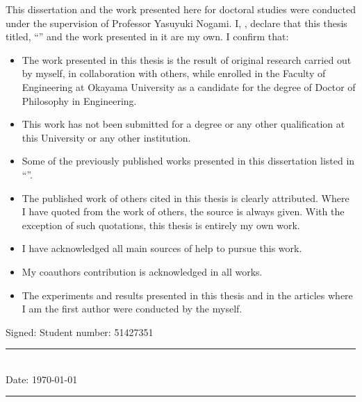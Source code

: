 \documentclass[
12pt, %
english, %
singlespacing, %
liststotoc, %
toctotoc, %
parskip, %
headsepline, %
consistentlayout, %
]{MastersDoctoralThesis} %
\begin{document}
\begin{declaration}
	
\addchaptertocentry{\authorshipname} %
\noindent This dissertation and the work presented here for doctoral studies were conducted under the supervision of Professor Yasuyuki Nogami. 
 I, \authorname, declare that this thesis titled, \enquote{\ttitle} and the work presented in it are my own. I confirm that:

\begin{itemize} 
\item 
The work presented in this thesis is the result of original research carried out by myself, in collaboration with others, while enrolled in the Faculty of Engineering at Okayama University as a candidate for the degree of Doctor of Philosophy in Engineering.

\item This work has not been submitted for a degree or any other qualification at this University or any other institution. 
 
\item  Some of the previously published works presented in this dissertation listed in ``''.

\item The published work of others cited in this thesis is clearly attributed.  Where I have quoted from the work of others, the source is always given. With the exception of such quotations, this thesis is entirely my own work.
\item I have acknowledged all main sources of help to pursue this work.
 \item My coauthors contribution is acknowledged  in all works. 
 \item The experiments and results presented in this thesis and in the articles where I am the first author were conducted by the myself.\\
\end{itemize}
 \vspace{8mm}
\noindent Signed: \quad \quad \quad \quad \authorname \quad \quad \quad \quad Student number: 51427351\\ 
\rule[0.5em]{36em}{0.5pt} \\
\noindent Date: \today \\
\rule[0.5em]{36em}{0.5pt} %
\end{declaration}
\end{document}
